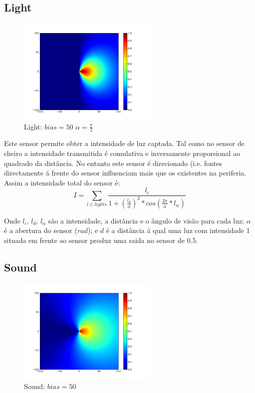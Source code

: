 \documentclass[a4paper]{article}
\begin{document}
\subsection{Light}
\begin{figure}[hb]
	\vspace{-20pt}
	\begin{center}
		\includegraphics[width=0.6\textwidth]{graphs/sensors/light.png}
	\end{center}
	\vspace{-20pt}
	\caption{Light: $bias=50$ $\alpha=\frac{\pi}{2}$}
\end{figure}

\indent Este sensor permite obter a intensidade de luz captada. Tal como no sensor de cheiro a intensidade transmitida
é comulativa e inversamente proporsional ao quadrado da distância. No entanto este sensor é direcionado (i.e. fontes
directamente á frente do sensor influenciam mais que os existentes na periferia. Assim a intensidade total do sensor é:
\[
	I = \displaystyle\sum\limits_{l \in lights} \frac{l_{i}}{1 + (\frac{l_{d}}{d})^{2}*cos(\frac{2\pi}{\alpha}*l_{\alpha})}
\]

Onde $l_{i}$, $l_{d}$, $l_{\alpha}$ são a intensidade, a distância e o ângulo de visão para cada luz;
$\alpha$ é a abertura do sensor ($rad$);
e $d$ é a distância á qual uma luz com intensidade 1 situada em frente ao sensor produz uma saida no sensor de 0.5.

\cleardoublepage
\subsection{Sound}
\begin{figure}[hb]
	\vspace{-20pt}
	\begin{center}
		\includegraphics[width=0.6\textwidth]{graphs/sensors/cardioid.png}
	\end{center}
	\vspace{-20pt}
	\caption{Sound: $bias=50$}
\end{figure}
\end{document}

